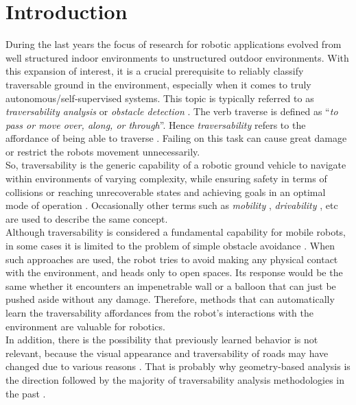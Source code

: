 \documentclass[12pt,a4paper,table,dvipsnames,tikz]{report}
\newcommand{\defn}[1]{\enquote{\textit{#1}}}
\newcommand{\term}{\textit}
\begin{document}
	{
		\hypersetup{linkcolor=black}
		\tableofcontents
		\listoftables
		\listoffigures
	}
	
	\chapter{Introduction}
	\label{sec:intro}
	
	During the last years the focus of research for robotic applications evolved 
	from well structured indoor environments to unstructured outdoor environments. 
	With this expansion of interest, it is a crucial prerequisite to reliably 
	classify traversable ground in the environment, especially when it comes to 
	truly autonomous/self-supervised systems. This topic is typically referred to as 
	\term{traversability analysis} or \term{obstacle detection} \citep{Suger}. The 
	verb traverse is defined as \defn{to pass or move over, along, or through}. 
	Hence \term{traversability} refers to the affordance of being able to traverse 
	\citep{Ugur}. Failing on this task can cause great damage or restrict the robots 
	movement unnecessarily.
	\\
	
	So, traversability is the generic capability of a robotic ground 
	vehicle to navigate within environments of varying complexity, while ensuring 
	safety in terms of collisions or reaching unrecoverable states and achieving 
	goals in an optimal mode of operation \citep{Papadakis}. Occasionally other 
	terms such as \term{mobility} \citep{Lalonde}, \term{drivability} \citep{Droeschel}, 
	etc are used to describe the same concept.
	\\
	
	Although traversability is considered a fundamental capability for mobile 
	robots, in some cases it is limited to the problem of simple obstacle avoidance 
	\citep{Ugur}. When such approaches are used, the robot tries to avoid making any 
	physical contact with the environment, and heads only to open spaces. Its 
	response would be the same whether it encounters an impenetrable wall or a 
	balloon that can just be pushed aside without any damage. Therefore, methods 
	that can automatically learn the traversability affordances from the 
	robot’s interactions with the environment are valuable for robotics.
	\\
		
	In addition, there is the possibility that previously learned behavior is not 
	relevant, because the visual appearance and traversability of roads may 
	have changed due to various reasons \citep{Wigness}. That is probably why 
	geometry-based analysis is the direction followed by the majority of 
	traversability analysis methodologies in the past \citep{Papadakis}.
	\\
	
\end{document}
